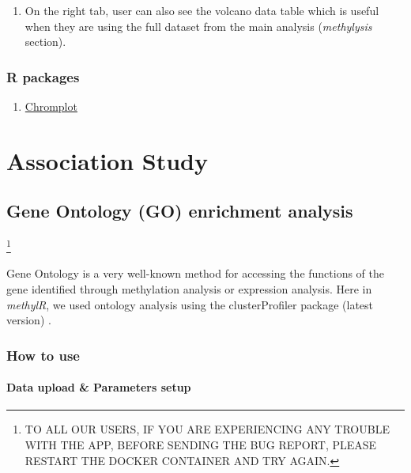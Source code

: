 \documentclass[
  a4paper,
  oneside,
  open=any]{scrreport}
\providecommand{\tightlist}{%
  \setlength{\itemsep}{0pt}\setlength{\parskip}{0pt}}\usepackage{longtable,booktabs,array}
\begin{document}
\begin{enumerate}
\def\labelenumi{\arabic{enumi}.}
\setcounter{enumi}{2}
\tightlist
\item
  On the right tab, user can also see the volcano data table which is
  useful when they are using the full dataset from the main analysis
  (\emph{methylysis} section).
\end{enumerate}

\hypertarget{r-packages}{%
\section{R packages}\label{r-packages}}

\begin{enumerate}
\def\labelenumi{\arabic{enumi}.}
\tightlist
\item
  \href{https://www.bioconductor.org/packages/release/bioc/vignettes/chromPlot/inst/doc/chromPlot.pdf}{Chromplot}
\end{enumerate}

\part{Association Study}

\hypertarget{sec-go}{%
\chapter{Gene Ontology (GO) enrichment analysis}\label{sec-go}}

\footnote{TO ALL OUR USERS, IF YOU ARE EXPERIENCING ANY TROUBLE WITH THE
  APP, BEFORE SENDING THE BUG REPORT, PLEASE RESTART THE DOCKER
  CONTAINER AND TRY AGAIN.}

Gene Ontology is a very well-known method for accessing the functions of
the gene identified through methylation analysis or expression analysis.
Here in \emph{methylR}, we used ontology analysis using the
clusterProfiler package (latest version)
\autocite{yu2012clusterprofiler,wu2021clusterprofiler}.

\hypertarget{how-to-use-7}{%
\section{How to use}\label{how-to-use-7}}

\hypertarget{data-upload-parameters-setup-4}{%
\subsection{Data upload \& Parameters
setup}\label{data-upload-parameters-setup-4}}
\end{document}
